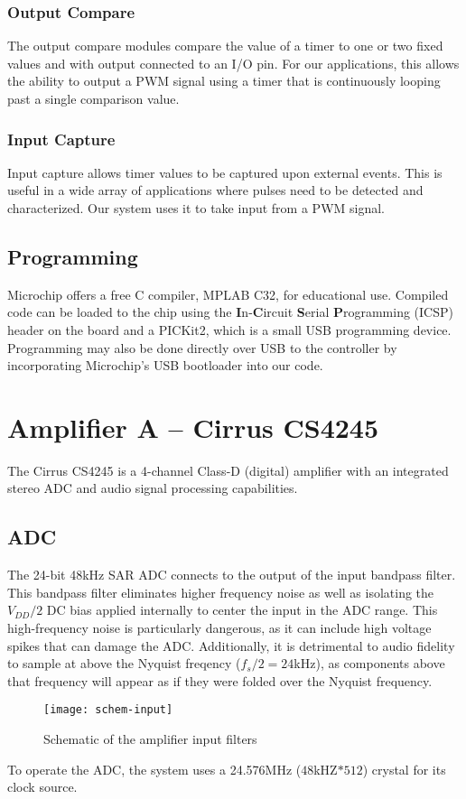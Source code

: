 \subsubsection{Output Compare}
The output compare modules compare the value of a timer to one or two fixed values and with output connected to an I/O pin. For our applications, this allows the ability to output a PWM signal using a timer that is continuously looping past a single comparison value.
\subsubsection{Input Capture}
Input capture allows timer values to be captured upon external events. This is useful in a wide array of applications where pulses need to be detected and characterized. Our system uses it to take input from a PWM signal.

\subsection{Programming}
Microchip offers a free C compiler, MPLAB C32, for educational use. Compiled code can be loaded to the chip using the \textbf{I}n-\textbf{C}ircuit \textbf{S}erial \textbf{P}rogramming (ICSP) header on the board and a PICKit2, which is a small USB programming device. Programming may also be done directly over USB to the controller by incorporating Microchip's USB bootloader into our code.

\section{Amplifier A -- Cirrus CS4245}
The Cirrus CS4245 is a 4-channel Class-D (digital) amplifier with an integrated stereo ADC and audio signal processing capabilities.

\subsection{ADC}
The 24-bit 48kHz SAR ADC connects to the output of the input bandpass filter. This bandpass filter eliminates higher frequency noise as well as isolating the $V_{DD}/2$ DC bias applied internally to center the input in the ADC range. This high-frequency noise is particularly dangerous, as it can include high voltage spikes that can damage the ADC. Additionally, it is detrimental to audio fidelity to sample at above the Nyquist freqency ($f_s/2 = 24$kHz), as components above that frequency will appear as if they were folded over the Nyquist frequency.
\begin{figure}[H]
	\centering
	\texttt{[image: schem-input]}
	\caption[Schematic -- Analog Input Filtering]%
	{Schematic of the amplifier input filters}
\end{figure}
To operate the ADC, the system uses a 24.576MHz ($48$kHZ$*512$) crystal for its clock source.

